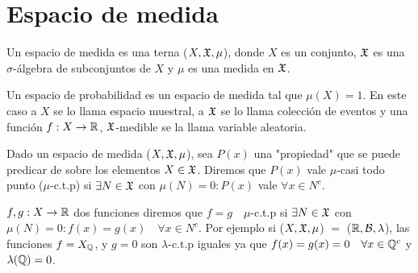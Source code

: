 \section{Espacio de medida}

\begin{definition}
    Un espacio de medida es una terna ($X, \mathfrak{X}, \mu$), donde $X$ es un conjunto, $\mathfrak{X}$ es una $\sigma$-álgebra de subconjuntos de $X$ y $\mu$ es una medida en $\mathfrak{X}$.
\end{definition}

Un espacio de probabilidad es un espacio de medida tal que $\mu(X) = 1$.
En este caso a $X$ se lo llama espacio muestral, a $\mathfrak{X}$ se lo llama colección de eventos y
una función $f: X \to \mathbb{R}$, $\mathfrak{X}$-medible se la llama variable aleatoria.

\begin{definition}
    Dado un espacio de medida ($X, \mathfrak{X}, \mu$), sea $P(x)$ una "propiedad" que se puede predicar de sobre los elementos $X \in \mathfrak{X}$.
    Diremos que $P(x)$ vale $\mu$-casi todo punto ($\mu$-c.t.p) si $\exists N \in \mathfrak{X}$ con $\mu(N) = 0 : P(x)$ vale $\forall x \in N^c$.
\end{definition}

\begin{eg}
    $f, g : X \to \mathbb{R}$ dos funciones diremos que $f = g \quad \mu$-c.t.p si $\exists N \in \mathfrak{X}$ con $\mu(N) = 0 : f(x) = g(x) \quad \forall x \in N^c$.
    Por ejemplo si ($X, \mathfrak{X}, \mu$) $=$ ($\mathbb{R}, \mathcal{B}, \lambda $), las funciones $f = X_{\mathbb{Q}}$, y $g = 0$ son $\lambda$-c.t.p iguales ya que
    $f(x) = g(x) = 0 \quad \forall x \in \mathbb{Q}^c$ y $\lambda(\mathbb{Q}) = 0$.
\end{eg}

